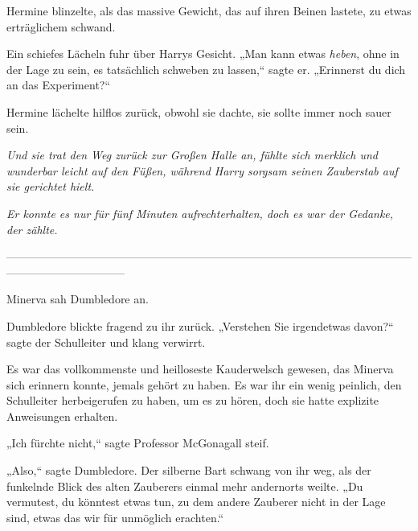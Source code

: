 Hermine blinzelte, als das massive Gewicht, das auf ihren Beinen lastete, zu etwas erträglichem schwand.

Ein schiefes Lächeln fuhr über Harrys Gesicht. „Man kann etwas \emph{heben}, ohne in der Lage zu sein, es tatsächlich schweben zu lassen,“ sagte er. „Erinnerst du dich an das Experiment?“

Hermine lächelte hilflos zurück, obwohl sie dachte, sie sollte immer noch sauer sein.

\emph{Und sie trat den Weg zurück zur Großen Halle an, fühlte sich merklich und wunderbar leicht auf den Füßen, während Harry sorgsam seinen Zauberstab auf sie gerichtet hielt.}

\emph{Er konnte es nur für fünf Minuten aufrechterhalten, doch es war der Gedanke, der zählte.}

\later
——————————————————————————————————————————————--

Minerva sah Dumbledore an.

Dumbledore blickte fragend zu ihr zurück. „Verstehen Sie irgendetwas davon?“ sagte der Schulleiter und klang verwirrt.

Es war das vollkommenste und heilloseste Kauderwelsch gewesen, das Minerva sich erinnern konnte, jemals gehört zu haben. Es war ihr ein wenig peinlich, den Schulleiter herbeigerufen zu haben, um es zu hören, doch sie hatte explizite Anweisungen erhalten.

„Ich fürchte nicht,“ sagte Professor McGonagall steif.

„Also,“ sagte Dumbledore. Der silberne Bart schwang von ihr weg, als der funkelnde Blick des alten Zauberers einmal mehr andernorts weilte. „Du vermutest, du könntest etwas tun, zu dem andere Zauberer nicht in der Lage sind, etwas das wir für unmöglich erachten.“

